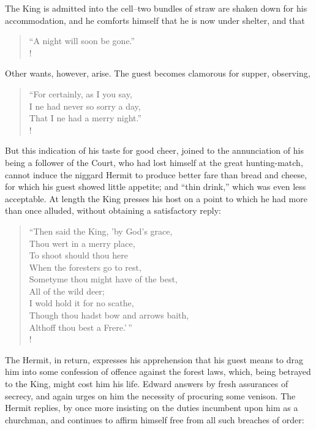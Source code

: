 The King is admitted into the cell--two bundles of straw are shaken down
for his accommodation, and he comforts himself that he is now under
shelter, and that

\begin{verse}
``A night will soon be gone.''\\!
\end{verse}

Other wants, however, arise. The guest becomes clamorous for supper,
observing,

\begin{verse}
``For certainly, as I you say,\\
I ne had never so sorry a day,\\
That I ne had a merry night.''\\!
\end{verse}

But this indication of his taste for good cheer, joined to the
annunciation of his being a follower of the Court, who had lost himself
at the great hunting-match, cannot induce the niggard Hermit to produce
better fare than bread and cheese, for which his guest showed little
appetite; and ``thin drink,'' which was even less acceptable. At length
the King presses his host on a point to which he had more than once
alluded, without obtaining a satisfactory reply:

\begin{verse}
``Then said the King, 'by God's grace,\\
Thou wert in a merry place,\\
To shoot should thou here\\
When the foresters go to rest,\\
Sometyme thou might have of the best,\\
All of the wild deer;\\
I wold hold it for no scathe,\\
Though thou hadst bow and arrows baith,\\
Althoff thou best a Frere.'\,''\\!
\end{verse}

The Hermit, in return, expresses his apprehension that his guest means
to drag him into some confession of offence against the forest laws,
which, being betrayed to the King, might cost him his life. Edward
answers by fresh assurances of secrecy, and again urges on him the
necessity of procuring some venison. The Hermit replies, by once more
insisting on the duties incumbent upon him as a churchman, and continues
to affirm himself free from all such breaches of order:

